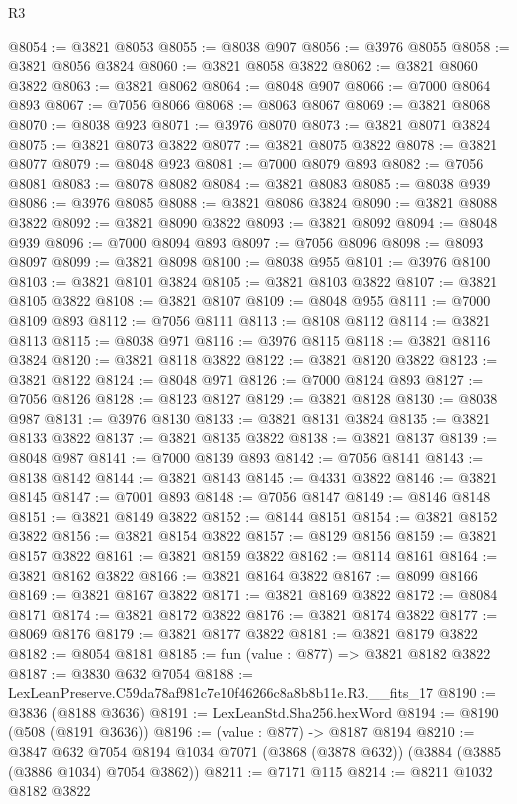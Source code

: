 \begin{lexlean}{R3}
\begin{coremodule}
@8054 := @3821 @8053
@8055 := @8038 @907
@8056 := @3976 @8055
@8058 := @3821 @8056 @3824
@8060 := @3821 @8058 @3822
@8062 := @3821 @8060 @3822
@8063 := @3821 @8062
@8064 := @8048 @907
@8066 := @7000 @8064 @893
@8067 := @7056 @8066
@8068 := @8063 @8067
@8069 := @3821 @8068
@8070 := @8038 @923
@8071 := @3976 @8070
@8073 := @3821 @8071 @3824
@8075 := @3821 @8073 @3822
@8077 := @3821 @8075 @3822
@8078 := @3821 @8077
@8079 := @8048 @923
@8081 := @7000 @8079 @893
@8082 := @7056 @8081
@8083 := @8078 @8082
@8084 := @3821 @8083
@8085 := @8038 @939
@8086 := @3976 @8085
@8088 := @3821 @8086 @3824
@8090 := @3821 @8088 @3822
@8092 := @3821 @8090 @3822
@8093 := @3821 @8092
@8094 := @8048 @939
@8096 := @7000 @8094 @893
@8097 := @7056 @8096
@8098 := @8093 @8097
@8099 := @3821 @8098
@8100 := @8038 @955
@8101 := @3976 @8100
@8103 := @3821 @8101 @3824
@8105 := @3821 @8103 @3822
@8107 := @3821 @8105 @3822
@8108 := @3821 @8107
@8109 := @8048 @955
@8111 := @7000 @8109 @893
@8112 := @7056 @8111
@8113 := @8108 @8112
@8114 := @3821 @8113
@8115 := @8038 @971
@8116 := @3976 @8115
@8118 := @3821 @8116 @3824
@8120 := @3821 @8118 @3822
@8122 := @3821 @8120 @3822
@8123 := @3821 @8122
@8124 := @8048 @971
@8126 := @7000 @8124 @893
@8127 := @7056 @8126
@8128 := @8123 @8127
@8129 := @3821 @8128
@8130 := @8038 @987
@8131 := @3976 @8130
@8133 := @3821 @8131 @3824
@8135 := @3821 @8133 @3822
@8137 := @3821 @8135 @3822
@8138 := @3821 @8137
@8139 := @8048 @987
@8141 := @7000 @8139 @893
@8142 := @7056 @8141
@8143 := @8138 @8142
@8144 := @3821 @8143
@8145 := @4331 @3822
@8146 := @3821 @8145
@8147 := @7001 @893
@8148 := @7056 @8147
@8149 := @8146 @8148
@8151 := @3821 @8149 @3822
@8152 := @8144 @8151
@8154 := @3821 @8152 @3822
@8156 := @3821 @8154 @3822
@8157 := @8129 @8156
@8159 := @3821 @8157 @3822
@8161 := @3821 @8159 @3822
@8162 := @8114 @8161
@8164 := @3821 @8162 @3822
@8166 := @3821 @8164 @3822
@8167 := @8099 @8166
@8169 := @3821 @8167 @3822
@8171 := @3821 @8169 @3822
@8172 := @8084 @8171
@8174 := @3821 @8172 @3822
@8176 := @3821 @8174 @3822
@8177 := @8069 @8176
@8179 := @3821 @8177 @3822
@8181 := @3821 @8179 @3822
@8182 := @8054 @8181
@8185 := fun (value : @877) => @3821 @8182 @3822
@8187 := @3830 @632 @7054
@8188 := LexLeanPreserve.C59da78af981c7e10f46266c8a8b8b11e.R3.__fits_17
@8190 := @3836 (@8188 @3636)
@8191 := LexLeanStd.Sha256.hexWord
@8194 := @8190 (@508 (@8191 @3636))
@8196 := (value : @877) -> @8187 @8194
@8210 := @3847
    @632
    @7054
    @8194
    @1034
    @7071
    (@3868 (@3878 @632))
    (@3884 (@3885 (@3886 @1034) @7054 @3862))
@8211 := @7171 @115
@8214 := @8211 @1032 @8182 @3822

\end{coremodule}
\end{lexlean}

